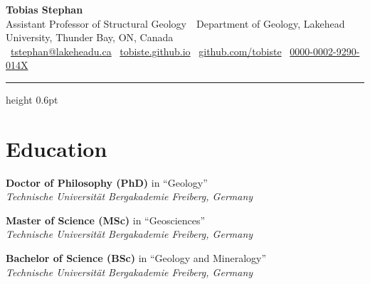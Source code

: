 \documentclass[10pt, paper=letter]{scrartcl} %
\begin{document}

\begin{cv}{}
    \begin{center}
        {\textcolor{myred}{\sffamily\LARGE\textbf{Tobias Stephan}}}\\[4pt]
        {\sffamily\small Assistant Professor of Structural Geology~\textbar~Department of Geology, Lakehead University, Thunder Bay, ON, Canada}\\[5pt]
        {\small
            \faEnvelope[regular]\ \href{mailto:tstephan@lakeheadu.ca}{tstephan@lakeheadu.ca}%
            \quad\textbar\quad
            \faGlobe\ \href{https://tobiste.github.io/}{tobiste.github.io}%
            \quad\textbar\quad
            \faGithub\ \href{https://github.com/tobiste/}{github.com/tobiste}%
            \quad\textbar\quad
            \ \href{https://orcid.org/0000-0002-9290-014X}{0000-0002-9290-014X}%
        }
    \end{center}
 
    \vspace{1pt}
    {\color{gray!60}\hrule height 0.6pt}
    \vspace{5pt}

\section{Education}
    \begin{cvlist}{}
        \item[2019/03] \textbf{Doctor of Philosophy (PhD)} in \enquote{Geology}\\ \textit{Technische Universit\"at Bergakademie Freiberg, Germany}

        \item[2013/09] \textbf{Master of Science (MSc)} in \enquote{Geosciences}\\
        \textit{Technische Universit\"at Bergakademie Freiberg, Germany}

        \item[2010/09] \textbf{Bachelor of Science (BSc)} in \enquote{Geology and Mineralogy}\\
        \textit{Technische Universit\"at Bergakademie Freiberg, Germany}

    \end{cvlist}


\end{cv}
\end{document}
